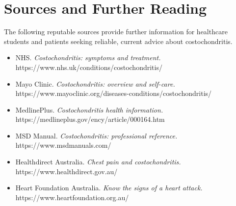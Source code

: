 \section*{Sources and Further Reading}
The following reputable sources provide further information for healthcare students and patients seeking reliable, current advice about costochondritis.

\begin{itemize}
    \item NHS. \textit{Costochondritis: symptoms and treatment.} https://www.nhs.uk/conditions/costochondritis/
    \item Mayo Clinic. \textit{Costochondritis: overview and self-care.} https://www.mayoclinic.org/diseases-conditions/costochondritis/
    \item MedlinePlus. \textit{Costochondritis health information.} https://medlineplus.gov/ency/article/000164.htm
    \item MSD Manual. \textit{Costochondritis: professional reference.} https://www.msdmanuals.com/
    \item Healthdirect Australia. \textit{Chest pain and costochondritis.} https://www.healthdirect.gov.au/
    \item Heart Foundation Australia. \textit{Know the signs of a heart attack.} https://www.heartfoundation.org.au/
\end{itemize}
